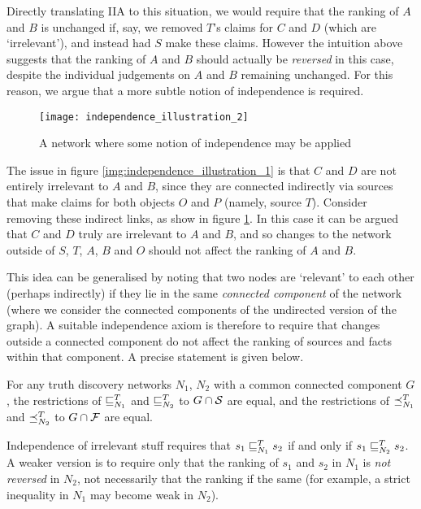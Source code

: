 \documentclass[../main.tex]{subfiles}
\begin{document}
Directly translating IIA to this situation, we would require that the ranking
of $A$ and $B$ is unchanged if, say, we removed $T$'s claims for $C$ and $D$
(which are `irrelevant'), and instead had $S$ make these claims. However the
intuition above suggests that the ranking of $A$ and $B$ should actually be
\emph{reversed} in this case, despite the individual judgements on $A$ and $B$
remaining unchanged. For this reason, we argue that a more subtle notion of
independence is required.

\begin{figure}
    \centering
    \texttt{[image: independence\_illustration\_2]}
    \caption{
        A network where some notion of independence may be applied
    }
    \label{img:independence_illustration_2}
\end{figure}

The issue in figure \ref{img:independence_illustration_1} is that $C$ and $D$
are not entirely irrelevant to $A$ and $B$, since they are connected indirectly
via sources that make claims for both objects $O$ and $P$ (namely, source $T$).
Consider removing these indirect links, as show in figure
\ref{img:independence_illustration_2}. In this case it can be argued that $C$
and $D$ truly are irrelevant to $A$ and $B$, and so changes to the network
outside of $S$, $T$, $A$, $B$ and $O$ should not affect the ranking of $A$ and
$B$.

This idea can be generalised by noting that two nodes are `relevant' to each
other (perhaps indirectly) if they lie in the same \emph{connected component}
of the network (where we consider the connected components of the undirected
version of the graph). A suitable independence axiom is therefore to require
that changes outside a connected component do not affect the ranking of sources
and facts within that component. A precise statement is given below.

\begin{axiom}
\label{axiom:indep}
For any truth discovery networks $N_1$, $N_2$ with a common connected component
$G$, the restrictions of $\sle_{N_1}^T$ and $\sle_{N_2}^T$ to $G \cap \S$ are
equal, and the restrictions of $\fle_{N_1}^T$ and $\fle_{N_2}^T$ to $G \cap \F$
are equal.
\end{axiom}

Independence of irrelevant stuff requires that $s_1 \sle_{N_1}^T s_2$ if and
only if $s_1 \sle_{N_2}^T s_2$. A weaker version is to require only that the
ranking of $s_1$ and $s_2$ in $N_1$ is \emph{not reversed} in $N_2$, not
necessarily that the ranking if the same (for example, a strict inequality in
$N_1$ may become weak in $N_2$).
\end{document}
